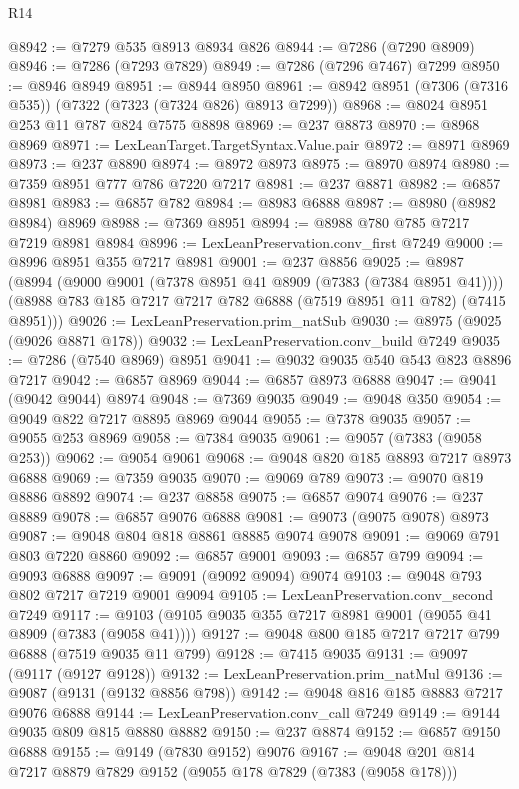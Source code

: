 \begin{lexlean}{R14}
\begin{coremodule}
@8942 := @7279 @535 @8913 @8934 @826
@8944 := @7286 (@7290 @8909)
@8946 := @7286 (@7293 @7829)
@8949 := @7286 (@7296 @7467) @7299
@8950 := @8946 @8949
@8951 := @8944 @8950
@8961 := @8942 @8951 (@7306 (@7316 @535)) (@7322 (@7323 (@7324 @826) @8913 @7299))
@8968 := @8024 @8951 @253 @11 @787 @824 @7575 @8898
@8969 := @237 @8873
@8970 := @8968 @8969
@8971 := LexLeanTarget.TargetSyntax.Value.pair
@8972 := @8971 @8969
@8973 := @237 @8890
@8974 := @8972 @8973
@8975 := @8970 @8974
@8980 := @7359 @8951 @777 @786 @7220 @7217
@8981 := @237 @8871
@8982 := @6857 @8981
@8983 := @6857 @782
@8984 := @8983 @6888
@8987 := @8980 (@8982 @8984) @8969
@8988 := @7369 @8951
@8994 := @8988 @780 @785 @7217 @7219 @8981 @8984
@8996 := LexLeanPreservation.conv_first @7249
@9000 := @8996 @8951 @355 @7217 @8981
@9001 := @237 @8856
@9025 := @8987
    (@8994
      (@9000 @9001 (@7378 @8951 @41 @8909 (@7383 (@7384 @8951 @41))))
      (@8988 @783 @185 @7217 @7217 @782 @6888 (@7519 @8951 @11 @782) (@7415 @8951)))
@9026 := LexLeanPreservation.prim_natSub
@9030 := @8975 (@9025 (@9026 @8871 @178))
@9032 := LexLeanPreservation.conv_build @7249
@9035 := @7286 (@7540 @8969) @8951
@9041 := @9032 @9035 @540 @543 @823 @8896 @7217
@9042 := @6857 @8969
@9044 := @6857 @8973 @6888
@9047 := @9041 (@9042 @9044) @8974
@9048 := @7369 @9035
@9049 := @9048 @350
@9054 := @9049 @822 @7217 @8895 @8969 @9044
@9055 := @7378 @9035
@9057 := @9055 @253 @8969
@9058 := @7384 @9035
@9061 := @9057 (@7383 (@9058 @253))
@9062 := @9054 @9061
@9068 := @9048 @820 @185 @8893 @7217 @8973 @6888
@9069 := @7359 @9035
@9070 := @9069 @789
@9073 := @9070 @819 @8886 @8892
@9074 := @237 @8858
@9075 := @6857 @9074
@9076 := @237 @8889
@9078 := @6857 @9076 @6888
@9081 := @9073 (@9075 @9078) @8973
@9087 := @9048 @804 @818 @8861 @8885 @9074 @9078
@9091 := @9069 @791 @803 @7220 @8860
@9092 := @6857 @9001
@9093 := @6857 @799
@9094 := @9093 @6888
@9097 := @9091 (@9092 @9094) @9074
@9103 := @9048 @793 @802 @7217 @7219 @9001 @9094
@9105 := LexLeanPreservation.conv_second @7249
@9117 := @9103 (@9105 @9035 @355 @7217 @8981 @9001 (@9055 @41 @8909 (@7383 (@9058 @41))))
@9127 := @9048 @800 @185 @7217 @7217 @799 @6888 (@7519 @9035 @11 @799)
@9128 := @7415 @9035
@9131 := @9097 (@9117 (@9127 @9128))
@9132 := LexLeanPreservation.prim_natMul
@9136 := @9087 (@9131 (@9132 @8856 @798))
@9142 := @9048 @816 @185 @8883 @7217 @9076 @6888
@9144 := LexLeanPreservation.conv_call @7249
@9149 := @9144 @9035 @809 @815 @8880 @8882
@9150 := @237 @8874
@9152 := @6857 @9150 @6888
@9155 := @9149 (@7830 @9152) @9076
@9167 := @9048 @201 @814 @7217 @8879 @7829 @9152 (@9055 @178 @7829 (@7383 (@9058 @178)))

\end{coremodule}
\end{lexlean}
